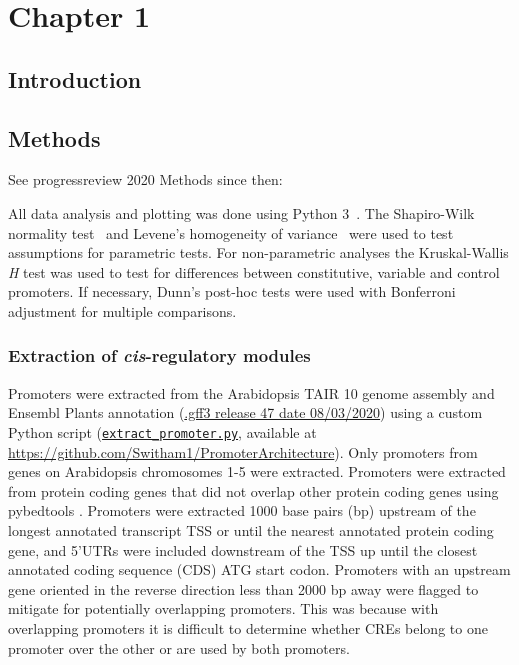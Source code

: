 \chapter{Chapter 1}\label{ch:1}

\section{Introduction}\label{chapter1:introduction}
\section{Methods}\label{chapter1:methods}
See progressreview 2020
Methods since then:


All data analysis and plotting was done using Python 3~\autocite{pythoncoreteamPythonDynamicOpen2020}.
The Shapiro\hyp{}Wilk normality test~\autocite{shapiroAnalysisVarianceTest1965} and Levene's homogeneity of variance~\autocite{leveneRobustTestsEquality1960} were used to test assumptions for parametric tests.
For non\hyp{}parametric analyses the Kruskal\hyp{}Wallis \textit{H} test \autocite{kruskalUseRanksOneCriterion1952} was used to test for differences between constitutive, variable and control promoters.
If necessary, Dunn's post\hyp{}hoc tests \autocite{dunnMultipleComparisonsUsing1964} were used with Bonferroni adjustment for multiple comparisons.

\subsection{Extraction of \textit{cis}-regulatory modules}\label{chapter1:methods:extraction-of-cis-regulatory-modules}

Promoters were extracted from the Arabidopsis TAIR 10 \autocite{lameschArabidopsisInformationResource2012} genome assembly and Ensembl Plants \autocite{howeEnsemblGenomes20202020} annotation (\href{ftp://ftp.ensemblgenomes.org/pub/release-47/plants/gff3/arabidopsis_thaliana/}{.gff3 release 47 date 08/03/2020}) using a custom Python script (\href{https://github.com/Switham1/PromoterArchitecture/blob/master/src/data_sorting/extract_promoter.py}{\texttt{extract\_promoter.py}}, available at \url{https://github.com/Switham1/PromoterArchitecture}).
Only promoters from genes on Arabidopsis chromosomes 1-5 were extracted.
Promoters were extracted from protein coding genes that did not overlap other protein coding genes using pybedtools \autocite{dalePybedtoolsFlexiblePython2011}.
Promoters were extracted 1000 base pairs (bp) upstream of the longest annotated transcript TSS or until the nearest annotated protein coding gene, and 5'UTRs were included downstream of the TSS up until the closest annotated coding sequence (CDS) ATG start codon.
Promoters with an upstream gene oriented in the reverse direction less than 2000 bp away were flagged to mitigate for potentially overlapping promoters.
This was because with overlapping promoters it is difficult to determine whether CREs belong to one promoter over the other or are used by both promoters.

